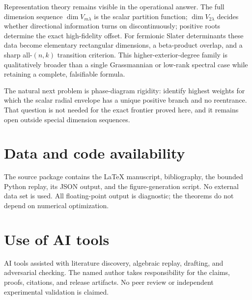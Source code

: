 \documentclass[11pt,a4paper]{article}
\begin{document}
Representation theory remains visible in the operational answer.  The full
dimension sequence $\dim V_{m\lambda}$ is the scalar partition function;
$\dim V_{2\lambda}$ decides whether directional information turns on
discontinuously; positive roots determine the exact high-fidelity offset.
For fermionic Slater determinants these data become elementary rectangular
dimensions, a beta-product overlap, and a sharp all-$(n,k)$ transition
criterion.  This higher-exterior-degree family is qualitatively broader than
a single Grassmannian or low-rank spectral case while retaining a complete,
falsifiable formula.

The natural next problem is phase-diagram rigidity: identify highest weights
for which the scalar radial envelope has a unique positive branch and no
reentrance.  That question is not needed for the exact frontier proved here,
and it remains open outside special dimension sequences.

\section*{Data and code availability}

The source package contains the LaTeX manuscript, bibliography, the bounded
Python replay, its JSON output, and the figure-generation script.  No
external data set is used.  All floating-point output is diagnostic; the
theorems do not depend on numerical optimization.

\section*{Use of AI tools}

AI tools assisted with literature discovery, algebraic replay, drafting, and
adversarial checking.  The named author takes responsibility for the claims,
proofs, citations, and release artifacts.  No peer review or independent
experimental validation is claimed.

\printbibliography
\end{document}
